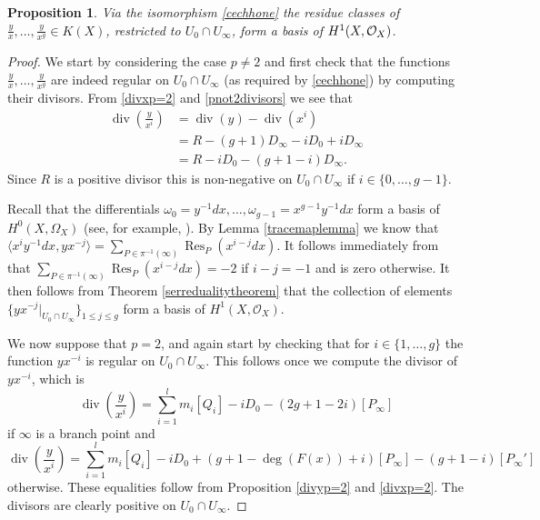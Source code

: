 \documentclass[11pt]{article} %
\theoremstyle{plain}
\newtheorem{prop}[defn]{Proposition}
\theoremstyle{remark}
\newcommand{\cO}{{\cal O}}
\newcommand{\hzero}{{H^0(X,\Omega_X)}}
\newcommand{\hone}{H^1(X,\mathcal{O}_X)}
\DeclareMathOperator{\res}{Res}
\DeclareMathOperator{\di}{div}
\begin{document}
\begin{prop}\label{basish1}
 Via the isomorphism \eqref{cechhone} the residue classes of $\frac{y}{x}, \ldots , \frac{y}{x^g} \in K(X)$, restricted to $U_0 \cap U_\infty$, form a basis of $H^1(X,\cO_X)$.
\end{prop}
\begin{proof}
We start by considering the case $p \neq 2$ and first check that the functions $\frac{y}{x}, \ldots, \frac{y}{x^g}$ are indeed regular on $U_0 \cap U_\infty$ (as required by \eqref{cechhone}) by computing their divisors.
From \eqref{divxp=2} and \eqref{pnot2divisors} we see that
\begin{align}\label{divisorofyoverx}
\di \left( \frac{y}{x^i} \right) & = \di (y) - \di ( x^i) \nonumber \\
& = R - (g+1)D_\infty - iD_0 + iD_\infty \nonumber \\
& = R - iD_0 - (g+1 - i)D_\infty.
\end{align}
Since $R$ is a positive divisor this is non-negative on $U_0 \cap U_\infty$ if $i\in \{0, \ldots, g-1\}$.


Recall that the differentials $\omega_0 = y^{-1}dx, \ldots, \omega_{g-1} = x^{g-1}y^{-1}dx$ form a basis of $\hzero$ (see, for example, \cite[Chap 7, Prop. 4.26]{liu}).
By Lemma \ref{tracemaplemma} we know that $\langle x^iy^{-1}dx, yx^{-j} \rangle = \sum_{P \in \pi^{-1}(\infty)}\res_P(x^{i-j}dx)$.
It follows immediately from \cite[Chap. III, Thm. 7.14.1(b)]{hart} that $\sum_{P \in \pi^{-1}(\infty)}\res_P(x^{i-j}dx) = -2$ if $i-j=-1$ and is zero otherwise.
It then follows from Theorem \ref{serredualitytheorem} that the collection of elements $\{ yx^{-j}|_{U_0\cap U_\infty}\}_{ 1 \leq j \leq g}$ form a basis of $\hone$.



We now suppose that $p=2$, and again start by checking that for $i \in \{1, \ldots , g\}$ the function $yx^{-i}$ is regular on $U_0 \cap U_\infty$.
This follows once we compute the divisor of $yx^{-i}$, which is
\begin{equation*}
\di \left( \frac{y}{x^i} \right)  =  
{\displaystyle \sum_{i=1}^l} m_i[Q_i] -iD_0 -(2g+1 - 2i)[P_\infty]
\end{equation*}
if $\infty$ is a branch point and
\begin{equation*}
\di \left( \frac{y}{x^i} \right)  =  
{\displaystyle \sum_{i=1}^l} m_i[Q_i] - iD_0 +(g+1-\deg(F(x)) + i)[P_\infty] - (g+1-i)[P_\infty']
\end{equation*}
otherwise.
These equalities follow from Proposition \ref{divyp=2} and \eqref{divxp=2}.
The divisors are clearly positive on $U_0 \cap U_\infty$.


\end{proof}
\end{document}
